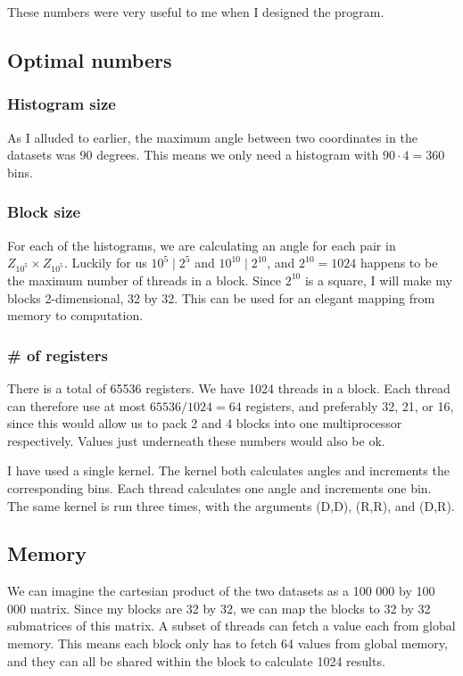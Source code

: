 \documentclass[a4paper,titlepage,12pt]{article}
\begin{document}
\begin{description}[left = \parindent]
\noindent These numbers were very useful to me when I designed the program.
\subsection{Optimal numbers}

\subsubsection{Histogram size}

As I alluded to earlier, the maximum angle between two coordinates in the datasets was 90 degrees.
This means we only need a histogram with \(90\cdot 4 = 360\) bins.

\subsubsection{Block size}

For each of the histograms, we are calculating an angle for each pair in \(Z_{10^5}\times Z_{10^5}\).
Luckily for us \(10^5 \mid 2^5\) and \(10^{10} \mid 2^{10}\), and \(2^{10} = 1024\) happens to be the maximum number of threads in a block.
Since \(2^{10}\) is a square, I will make my blocks 2-dimensional, 32 by 32.
This can be used for an elegant mapping from memory to computation.


\subsubsection{\# of registers}
There is a total of 65536 registers.
We have 1024 threads in a block.
Each thread can therefore use at most \(65536/1024 = 64\) registers, and preferably 32, 21, or 16, since this would allow us to pack 2 and 4 blocks into one multiprocessor respectively.
Values just underneath these numbers would also be ok.

I have used a single kernel.
The kernel both calculates angles and increments the corresponding bins.
Each thread calculates one angle and increments one bin.
The same kernel is run three times, with the arguments (D,D), (R,R), and (D,R).

\subsection{Memory}

We can imagine the cartesian product of the two datasets as a 100 000 by 100 000 matrix.
Since my blocks are 32 by 32, we can map the blocks to 32 by 32 submatrices of this matrix.
A subset of threads can fetch a value each from global memory.
This means each block only has to fetch 64 values from global memory, and they can all be shared within the block to calculate 1024 results.


\end{description}
\end{document}
